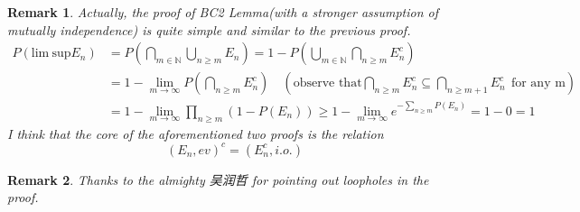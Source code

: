 \documentclass[UTF8, 12pt]{ctexart}
\newtheorem{remark}{Remark}
\begin{document}
    \begin{remark}
        Actually, the proof of \textit{BC2 Lemma}(with a stronger assumption of mutually independence) is quite simple and similar to the previous proof.
        \begin{align*}
            P(\text{lim}\ \text{sup} E_n) &= P(\bigcap_{m\in\mathbb{N}}\bigcup_{n\geq m} E_n) = 1 - P(\bigcup_{m\in\mathbb{N}}\bigcap_{n\geq m} E_n^c)\ \\
            &= 1 - \lim_{m\to\infty} P(\bigcap_{n\geq m} E_n^c)\quad (\text{observe that} \bigcap_{n\geq m} E_n^c \subseteq \bigcap_{n\geq m+1} E_n^c\ \ \text{for any m} )\\ 
            &= 1 - \lim_{m\to\infty}\prod_{n\geq m}(1-P(E_n)) \geq 1 - \lim_{m\to\infty} e^{-\sum_{n\geq m}P(E_n)} = 1 - 0 = 1
        \end{align*}
        I think that the core of the aforementioned two proofs is the relation $$ (E_n, ev)^c = (E_n^c, i.o.) $$
    \end{remark}

    \begin{remark}
        Thanks to the almighty 吴润哲 for pointing out loopholes in the proof.
    \end{remark}
\end{document}
